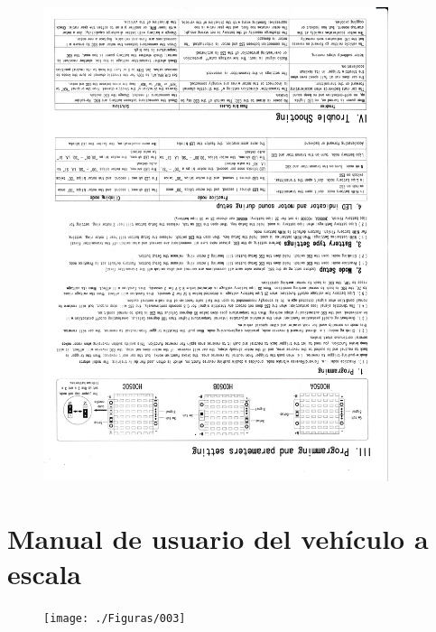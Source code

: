 \documentclass[12pt, letterpaper, oneside]{book}
\begin{document}
	\begin{figure}[htbp!]
		\centering
		\includegraphics[width=0.9\textwidth, angle=180]{./Figuras/002}
	\end{figure}
	\newpage 
	\section{Manual de usuario del vehículo a escala}
	\label{sec:vrx}
	\vspace*{-0.3cm}
	\begin{figure}[htbp!]
		\centering
		\texttt{[image: ./Figuras/003]}
	\end{figure}
	\newpage
\end{document}
